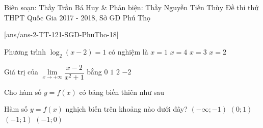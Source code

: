 
\begin{name}
{Biên soạn: Thầy Trần Bá Huy \& Phản biện: Thầy Nguyễn Tiến Thùy}
{Đề thi thử THPT Quốc Gia 2017 - 2018, Sở GD Phú Thọ}
\end{name}
\setcounter{ex}{0}\setcounter{bt}{0}
[ans/ans-2-TT-121-SGD-PhuTho-18]

\begin{ex}%
Phương trình $\log_2(x-2)=1$ có nghiệm là
\choice
{$x=1$}
{\True $x=4$}
{$x=3$}
{$x=2$}
\end{ex}



\begin{ex}%
Giá trị của $\displaystyle\lim\limits_{x\to +\infty}\dfrac{x-2}{x^2+1}$ bằng
\choice
{\True $0$}
{$1$}
{$2$}
{$-2$}
\end{ex}



\begin{ex}%
Cho hàm số $y=f(x)$ có bảng biến thiên như sau
\begin{center}
\end{center}
Hàm số $y=f(x)$ nghịch biến trên khoảng nào dưới đây?
\choice
{$(-\infty;-1)$}
{$(0;1)$}
{$(-1;1)$}
{\True $(-1;0)$}
\end{ex}



